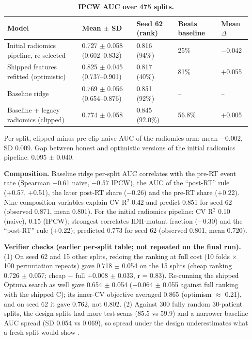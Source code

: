 \documentclass[11pt,a4paper]{article}
\begin{document}
\begin{table}[H]
\centering
\small
\renewcommand{\thetable}{S14}\renewcommand{\theHtable}{S14}
\caption{\textbf{IPCW AUC over 475 splits.}}
\label{tab:S14}
\begin{tabularx}{\linewidth}{@{}L R{4.82cm} R{2.55cm} R{2.20cm} R{1.15cm}@{}}
\toprule
Model & Mean $\pm$ SD & Seed 62 (rank) & Beats baseline & Mean $\Delta$ \\
\midrule
Initial radiomics pipeline, re-selected & 0.727 $\pm$ 0.058 (0.602--0.832) & 0.816 (94\%) & 25\% & $-$0.042 \\
Shipped features refitted (optimistic) & 0.825 $\pm$ 0.045 (0.737--0.901) & 0.817 (40\%) & 81\% & +0.055 \\
Baseline ridge & 0.769 $\pm$ 0.056 (0.654--0.876) & 0.851 (92\%) & -- & -- \\
Baseline + legacy radiomics (clipped) & 0.774 $\pm$ 0.058 & 0.845 (92.0\%) & 56.8\% & +0.005 \\
\bottomrule
\end{tabularx}
\end{table}

Per split, clipped minus pre-clip naive AUC of the radiomics arm: mean $-$0.002, SD 0.009. Gap between honest
and optimistic versions of the initial radiomics pipeline: 0.095 $\pm$ 0.040.

\textbf{Composition.} Baseline ridge per-split AUC correlates with the pre-RT event rate (Spearman $-$0.61
naive, $-$0.57 IPCW), the AUC of the ``post-RT'' rule (+0.57, +0.51), the later post-RT share ($-$0.26) and
the pre-RT share (+0.22). Nine composition variables explain CV R$^{2}$ 0.42 and predict 0.851 for seed 62
(observed 0.871, mean 0.801). For the initial radiomics pipeline: CV R$^{2}$ 0.10 (naive), 0.15 (IPCW); strongest
correlates IDH-mutant fraction ($-$0.30) and the ``post-RT'' rule (+0.22); predicted 0.773 for seed 62
(observed 0.801, mean 0.720).

\textbf{Verifier checks (earlier per-split table; not repeated on the final run).} (1) On seed 62 and 15 other
splits, redoing the ranking at full cost (10 folds $\times$ 100 permutation repeats) gave 0.718 $\pm$ 0.054 on
the 15 splits (cheap ranking 0.726 $\pm$ 0.057; cheap $-$ full +0.008 $\pm$ 0.033, r = 0.83). Re-running the
shipped Optuna search as well gave 0.654 $\pm$ 0.054 ($-$0.064 $\pm$ 0.055 against full ranking with the
shipped C); its inner-CV objective averaged 0.865 (optimism $\approx$ 0.21), and on seed 62 it gave 0.762, not
0.802. (2) Against 300 fully random 30-patient splits, the design splits had more test scans (85.5 vs 59.9)
and a narrower baseline AUC spread (SD 0.054 vs 0.069), so spread under the design underestimates what a fresh
split would show \citep{varoquaux2018}.
\end{document}

